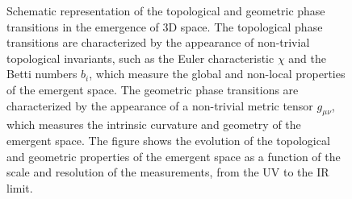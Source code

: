 \begin{figure}[h]
    \centering
    \caption{Schematic representation of the topological and geometric phase transitions in the emergence of 3D space. The topological phase transitions are characterized by the appearance of non-trivial topological invariants, such as the Euler characteristic $\chi$ and the Betti numbers $b_i$, which measure the global and non-local properties of the emergent space. The geometric phase transitions are characterized by the appearance of a non-trivial metric tensor $g_{\mu\nu}$, which measures the intrinsic curvature and geometry of the emergent space. The figure shows the evolution of the topological and geometric properties of the emergent space as a function of the scale and resolution of the measurements, from the UV to the IR limit.}
    \label{fig:topological_phases}
\end{figure}

